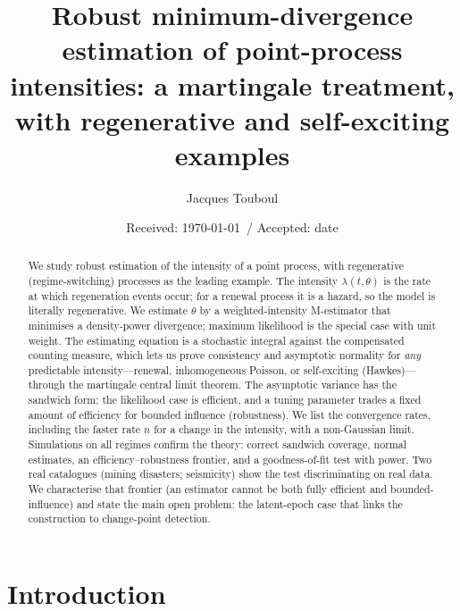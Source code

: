 \documentclass[smallextended,natbib]{svjour3}
\begin{document}
\title{Robust minimum-divergence estimation of point-process intensities: a martingale treatment, with regenerative and self-exciting examples}
\author{Jacques Touboul}
\date{Received: \today\ / Accepted: date}
\maketitle

\begin{abstract}
We study robust estimation of the intensity of a point process, with regenerative
(regime-switching) processes as the leading example. The intensity
$\lambda(t,\theta)$ is the rate at which regeneration events occur; for a renewal
process it is a hazard, so the model is literally regenerative. We estimate
$\theta$ by a weighted-intensity M-estimator that minimises a density-power
divergence; maximum likelihood is the special case with unit weight. The
estimating equation is a stochastic integral against the compensated counting
measure, which lets us prove consistency and asymptotic normality for \emph{any}
predictable intensity---renewal, inhomogeneous Poisson, or self-exciting
(Hawkes)---through the martingale central limit theorem. The asymptotic variance
has the sandwich form; the likelihood case is efficient, and a tuning parameter
trades a fixed amount of efficiency for bounded influence (robustness). We list
the convergence rates, including the faster rate $n$ for a change in the intensity,
with a non-Gaussian limit. Simulations on all regimes confirm the theory:
correct sandwich coverage, normal estimates, an efficiency--robustness frontier,
and a goodness-of-fit test with power. Two real catalogues (mining disasters;
seismicity) show the test discriminating on real data. We characterise that frontier (an estimator
cannot be both fully efficient and bounded-influence) and state the main open
problem: the latent-epoch case that links the construction to change-point
detection.
\end{abstract}

\section{Introduction}
\label{sec:intro}
\end{document}

